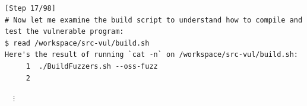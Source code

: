 \begin{tcolorbox}[enhanced,title={Example of repeatedly generating different PoCs but not succeeding}]
\begin{verbatim}
[Step 17/98]
# Now let me examine the build script to understand how to compile and test the vulnerable program:
$ read /workspace/src-vul/build.sh
Here's the result of running `cat -n` on /workspace/src-vul/build.sh:
     1	./BuildFuzzers.sh --oss-fuzz
     2
\end{verbatim}
\noindent
$\quad\vdots$






\end{tcolorbox}
